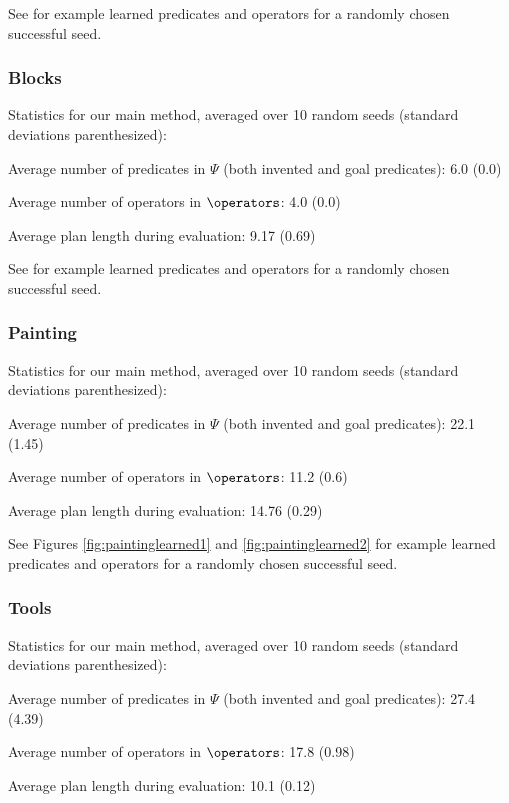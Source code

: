 See  for example learned predicates and operators for a randomly chosen successful seed.


\subsubsection{Blocks}
Statistics for our main method, averaged over 10 random seeds (standard deviations parenthesized):
\begin{tightlist}
\item Average number of predicates in $\Psi$ (both invented and goal predicates): 6.0 (0.0)
\item Average number of operators in $\operators$: 4.0 (0.0)
\item Average plan length during evaluation: 9.17 (0.69)
\end{tightlist}

See  for example learned predicates and operators for a randomly chosen successful seed.


\subsubsection{Painting}
Statistics for our main method, averaged over 10 random seeds (standard deviations parenthesized):
\begin{tightlist}
\item Average number of predicates in $\Psi$ (both invented and goal predicates): 22.1 (1.45)
\item Average number of operators in $\operators$: 11.2 (0.6)
\item Average plan length during evaluation: 14.76 (0.29)
\end{tightlist}

See Figures \ref{fig:paintinglearned1} and \ref{fig:paintinglearned2} for example learned predicates and operators for a randomly chosen successful seed.



\subsubsection{Tools}
Statistics for our main method, averaged over 10 random seeds (standard deviations parenthesized):
\begin{tightlist}
\item Average number of predicates in $\Psi$ (both invented and goal predicates): 27.4 (4.39)
\item Average number of operators in $\operators$: 17.8 (0.98)
\item Average plan length during evaluation: 10.1 (0.12)
\end{tightlist}

